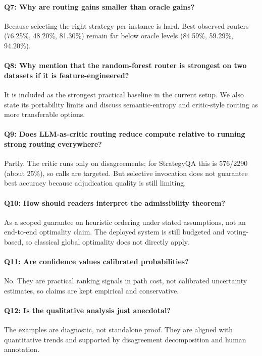\documentclass[11pt]{article}
\begin{document}
\paragraph{Q7: Why are routing gains smaller than oracle gains?}
Because selecting the right strategy per instance is hard. Best observed routers (76.25\%, 48.20\%, 81.30\%) remain far below oracle levels (84.59\%, 59.29\%, 94.20\%).

\paragraph{Q8: Why mention that the random-forest router is strongest on two datasets if it is feature-engineered?}
It is included as the strongest practical baseline in the current setup. We also state its portability limits and discuss semantic-entropy and critic-style routing as more transferable options.

\paragraph{Q9: Does LLM-as-critic routing reduce compute relative to running strong routing everywhere?}
Partly. The critic runs only on disagreements; for StrategyQA this is 576/2290 (about 25\%), so calls are targeted. But selective invocation does not guarantee best accuracy because adjudication quality is still limiting.

\paragraph{Q10: How should readers interpret the admissibility theorem?}
As a scoped guarantee on heuristic ordering under stated assumptions, not an end-to-end optimality claim. The deployed system is still budgeted and voting-based, so classical global optimality does not directly apply.

\paragraph{Q11: Are confidence values calibrated probabilities?}
No. They are practical ranking signals in path cost, not calibrated uncertainty estimates, so claims are kept empirical and conservative.

\paragraph{Q12: Is the qualitative analysis just anecdotal?}
The examples are diagnostic, not standalone proof. They are aligned with quantitative trends and supported by disagreement decomposition and human annotation.
\end{document}
